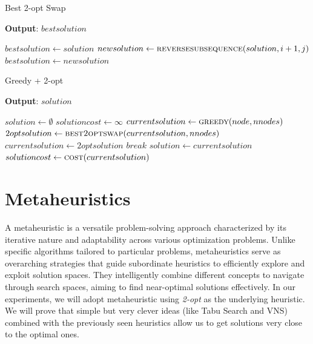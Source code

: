 \documentclass{article}
\begin{document}
\begin{algorithm}[ht]
\caption{Best 2-opt Swap}
\label{alg:best2optswap}
\hspace*{0.5em} \textbf{Output}: $bestsolution$
\begin{algorithmic}
\State $bestsolution \gets solution$
                        \State $newsolution \gets \Call{reversesubsequence}{solution, i + 1, j}$
                                \State $bestsolution \gets newsolution$
                        \EndIf
                \EndFor
        \EndFor
\EndProcedure
\end{algorithmic}
\end{algorithm}

\begin{algorithm}[ht]
\caption{Greedy + 2-opt}
\label{alg:greedy_2opt}
\hspace*{0.5em} \textbf{Output}: $solution$
\begin{algorithmic}
        \State $solution \gets \emptyset$
        \State $solutioncost \gets \infty$
                \State $currentsolution \gets \Call{greedy}{node, nnodes}$
                        \State $2optsolution \gets \Call{best2optswap}{currentsolution, nnodes}$
                                \State $currentsolution \gets 2optsolution$
                        \Else
                                \State $break$
                        \EndIf
                \EndWhile
                        \State $solution \gets currentsolution$
                        \State $solutioncost \gets \Call{cost}{currentsolution}$
                \EndIf
        \EndFor
\EndProcedure
\end{algorithmic}
\end{algorithm}

\clearpage

\section{Metaheuristics}
A metaheuristic is a versatile problem-solving approach characterized by its iterative nature and adaptability across various optimization problems. Unlike specific algorithms tailored to particular problems, metaheuristics serve as overarching strategies that guide subordinate heuristics to efficiently explore and exploit solution spaces. They intelligently combine different concepts to navigate through search spaces, aiming to find near-optimal solutions effectively.
In our experiments, we will adopt metaheuristic using \textit{2-opt} as the underlying
heuristic. We will prove that simple but very clever ideas (like Tabu Search and VNS) combined with the previously seen heuristics allow us to get solutions very close to the optimal ones.
\end{document}
